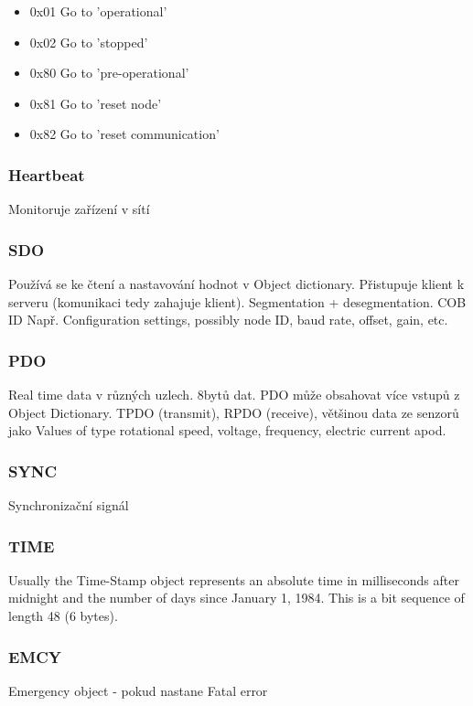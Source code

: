 \documentclass[
  field=ainfk,
  biblatex,
  glossaries,
  index
]{kidiplom}
\begin{document}
\begin{itemize}
    \item 0x01  Go to 'operational'
    \item 0x02  Go to 'stopped'
    \item 0x80  Go to 'pre-operational'
    \item 0x81  Go to 'reset node'
    \item 0x82  Go to 'reset communication'
\end{itemize}

\subsubsection{Heartbeat}
Monitoruje zařízení v sítí

\subsubsection{SDO}
Používá se ke čtení a nastavování hodnot v Object dictionary. Přistupuje klient k serveru (komunikaci tedy zahajuje klient). Segmentation + desegmentation. COB ID Např. Configuration settings, possibly node ID, baud rate, offset, gain, etc.

\subsubsection{PDO}
Real time data v různých uzlech. 8bytů dat. PDO může obsahovat více vstupů z Object Dictionary. TPDO (transmit), RPDO (receive), většinou data ze senzorů jako Values of type rotational speed, voltage, frequency, electric current apod.

\subsubsection{SYNC}
Synchronizační signál

\subsubsection{TIME}
Usually the Time-Stamp object represents an absolute time in milliseconds after midnight and the number of days since January 1, 1984. This is a bit sequence of length 48 (6 bytes).

\subsubsection{EMCY}
Emergency object - pokud nastane Fatal error
\end{document}

